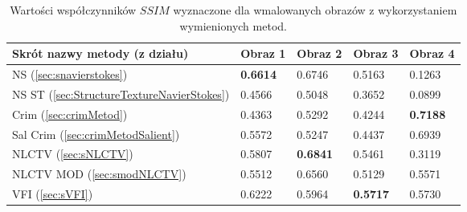 \documentclass[12pt, twoside, openany]{report}
\theoremstyle{definition}
\begin{document}
\begin{table}[!h]
\begin{center}
 \begin{tabular}{| p{5.7cm} || P{1.5cm} | P{1.5cm} | P{1.5cm} | P{1.5cm} |} 
 \hline
Skrót nazwy metody (z działu) & Obraz 1 & Obraz 2 & Obraz 3 & Obraz 4 \\ \hline \hline

NS (\ref{sec:snavierstokes}) &
\textbf{0.6614} & 0.6746 & 0.5163 & 0.1263 \\ \hline

NS ST (\ref{sec:StructureTextureNavierStokes}) &
0.4566 & 0.5048 & 0.3652 & 0.0899 \\ \hline

Crim (\ref{sec:crimMetod}) &
0.4363 & 0.5292 & 0.4244 & \textbf{0.7188} \\ \hline

Sal Crim (\ref{sec:crimMetodSalient}) &
0.5572 & 0.5247 & 0.4437 & 0.6939 \\ \hline

NLCTV (\ref{sec:sNLCTV}) &
0.5807 & \textbf{0.6841} & 0.5461 & 0.3119 \\ \hline

NLCTV MOD (\ref{sec:smodNLCTV}) &
0.5512 & 0.6560 & 0.5129 & 0.5571 \\ \hline

VFI (\ref{sec:sVFI}) &
0.6222 & 0.5964 & \textbf{0.5717} & 0.5730 \\ \hline

\end{tabular}
\caption{Wartości współczynników $SSIM$ wyznaczone dla wmalowanych obrazów z wykorzystaniem wymienionych metod.}
\label{TabCompare}
\end{center}
\end{table}
\end{document}
